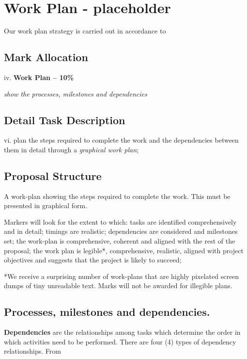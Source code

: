 \section{Work Plan - placeholder}

Our work plan strategy is carried out in accordance to \parencite{Dawson:2009:PCI:1611433} 

\subsection{Mark Allocation}

iv. \textbf{Work Plan -- 10\%}

\textit{show the processes, milestones and dependencies}

\subsection{Detail Task Description} 

vi. plan the steps required to complete the work and the dependencies between them in detail through a \textit{graphical work plan};

\subsection{Proposal Structure}

A work-plan showing the steps required to complete the work. This must be presented in graphical form.

Markers will look for the extent to which: tasks are identified comprehensively and in detail; timings are realistic; dependencies are considered and milestones set; the work-plan is comprehensive, coherent and aligned with the rest of the proposal; the work plan is legible*, comprehensive, realistic, aligned with project objectives and suggests that the project is likely to succeed;

*We receive a surprising number of work-plans that are highly pixelated screen dumps of tiny unreadable text. Marks will not be awarded for illegible plans.

\subsection{Processes, milestones and dependencies.}

\textbf{Dependencies} are the relationships among tasks which determine the order in which activities need to be performed. There are four (4) types of dependency relationships. From  

